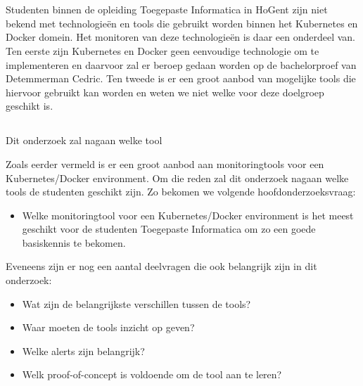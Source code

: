 
\chapter{}
\label{ch:inleiding}


\section{}
\label{sec:probleemstelling}

Studenten binnen de opleiding Toegepaste Informatica in HoGent zijn niet bekend met technologieën en tools die gebruikt worden binnen het Kubernetes en Docker domein. Het monitoren van deze technologieën is daar een onderdeel van. Ten eerste zijn Kubernetes en Docker geen eenvoudige technologie om te implementeren en daarvoor zal er beroep gedaan worden op de bachelorproef van Detemmerman Cedric. Ten tweede is er een groot aanbod van mogelijke tools die hiervoor gebruikt kan worden en weten we niet welke voor deze doelgroep geschikt is.


\section{}
\label{sec:onderzoeksvraag}

Dit onderzoek zal nagaan welke tool 

Zoals eerder vermeld is er een groot aanbod aan monitoringtools voor een Kubernetes/Docker environment. Om die reden zal dit onderzoek nagaan welke tools de studenten geschikt zijn. Zo bekomen we volgende hoofdonderzoeksvraag:

\begin{itemize}
    \item Welke monitoringtool voor een Kubernetes/Docker environment is het meest geschikt voor de studenten Toegepaste Informatica om zo een goede basiskennis te bekomen.
\end{itemize}

Eveneens zijn er nog een aantal deelvragen die ook belangrijk zijn in dit onderzoek:

\begin{itemize}
    \item Wat zijn de belangrijkste verschillen tussen de tools?
    \item Waar moeten de tools inzicht op geven?
    \item Welke alerts zijn belangrijk?
    \item Welk proof-of-concept is voldoende om de tool aan te leren?
\end{itemize}

